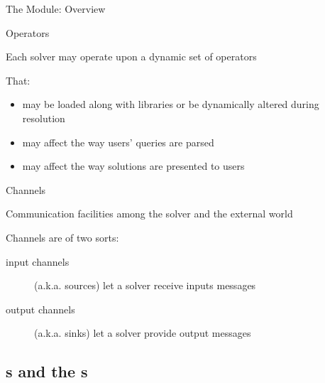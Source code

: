 \documentclass[handout]{beamer}
\begin{document}
\begin{frame}[allowframebreaks]{The  Module: Overview}
    \framebreak

    \begin{block}{Operators}
        \begin{center}
            Each solver may operate upon a dynamic set of operators
        \end{center}
        
        That:
        \begin{itemize}
            \item may be loaded along with libraries or be dynamically altered during resolution
            \item may affect the way users' queries are parsed
            \item may affect the way solutions are presented to users
        \end{itemize}
    \end{block}

    \framebreak

    \begin{block}{Channels}
        \begin{center}
            Communication facilities among the solver and the external world
        \end{center}
        
        Channels are of two sorts:
        \begin{description}
            \item[input channels] (a.k.a. \alert{sources}) let a solver receive inputs messages
            \item[output channels] (a.k.a. \alert{sinks}) let a solver provide output messages
        \end{description}
    \end{block}
\end{frame}

\subsection{s and the s}
\end{document}
